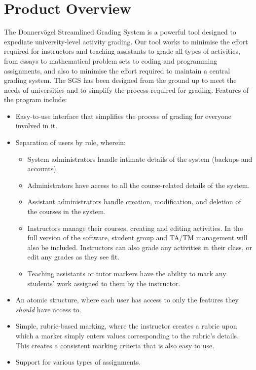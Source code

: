 \documentclass{article}
\begin{document}
\section{Product Overview}  %
The Donnervögel Streamlined Grading System is a powerful tool designed to 
expediate university-level activity grading. Our tool works to minimise the effort 
required for instructors and teaching assistants to grade all types of activities, 
from essays to mathematical problem sets to coding and programming assignments,
and also to minimise the effort required to maintain a central grading system. The 
SGS has been designed from the ground up to meet the needs of universities and 
to simplify the process required for grading. Features of the program include:
\begin{itemize}
  \item Easy-to-use interface that simplifies the process of grading for everyone
    involved in it.
  \item Separation of users by role, wherein:
    \begin{itemize}
      \item System administrators handle intimate details of the system (backups and
	accounts).
      \item Administrators have access to all the course-related details of the system.
      \item Assistant administrators handle creation, modification, and deletion of the
	courses in the system.
      \item Instructors manage their courses, creating and editing activities.
        In the full version of the software, student group and TA/TM management
        will also be included. Instructors can also grade any activities in their
        class, or edit any grades as they see fit.
      \item Teaching assistants or tutor markers have the ability to mark any students'
	work assigned to them by the instructor.
    \end{itemize}
  \item An atomic structure, where each user has access to only the features they 
    \emph{should} have access to.
  \item Simple, rubric-based marking, where the instructor creates a rubric upon which
    a marker simply enters values corresponding to the rubric's details. This creates
    a consistent marking criteria that is also easy to use.
  \item Support for various types of assignments. 

\end{itemize}
\end{document}
